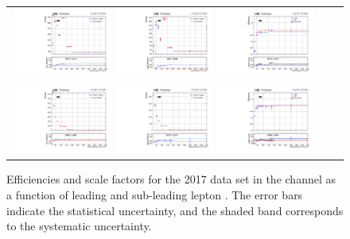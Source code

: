 {\begin{figure}[h]
  \begin{center}
    \begin{tabular}{ccc}
      \includegraphics[width=0.32\textwidth]{fig_2017_TrigSF/g_lepApt_ee_MC.pdf}
      \includegraphics[width=0.32\textwidth]{fig_2017_TrigSF/g_lepApt_ee_data.pdf}
      \includegraphics[width=0.32\textwidth]{fig_2017_TrigSF/g_ee_lepApt_FullSystUncBand.pdf}\\
      \includegraphics[width=0.32\textwidth]{fig_2017_TrigSF/g_lepBpt_ee_MC.pdf}
      \includegraphics[width=0.32\textwidth]{fig_2017_TrigSF/g_lepBpt_ee_data.pdf}
      \includegraphics[width=0.32\textwidth]{fig_2017_TrigSF/g_ee_lepBpt_FullSystUncBand.pdf}\\
    \end{tabular}
    \caption{Efficiencies and scale factors for the 2017 data set in the \ee channel as a function of leading and sub-leading lepton \pT.
            The error bars indicate the statistical uncertainty, and the shaded band corresponds to the systematic uncertainty.
            }
    \label{TrigSF_2017_2}
  \end{center}
\end{figure}

}
